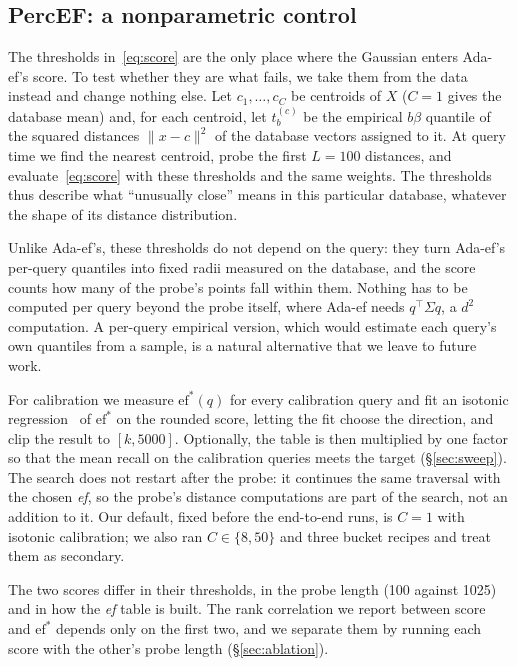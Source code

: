 \documentclass[sigconf,anonymous]{acmart}
\newcommand{\ef}{\textit{ef}}
\begin{document}
\subsection{PercEF: a nonparametric control}

The thresholds in~\eqref{eq:score} are the only place where the Gaussian enters Ada-ef's score.
To test whether they are what fails, we take them from the data instead and change nothing else. Let $c_1,\dots,c_C$ be centroids of $X$ ($C = 1$ gives the
database mean) and, for each centroid, let $t^{(c)}_b$ be the empirical $b\beta$ quantile of the
squared distances $\lVert x - c \rVert^2$ of the database vectors assigned to it. At query time we
find the nearest centroid, probe the first $L = 100$ distances, and evaluate~\eqref{eq:score} with
these thresholds and the same weights. The thresholds thus describe what ``unusually close'' means
in this particular database, whatever the shape of its distance distribution.

Unlike Ada-ef's, these thresholds do not depend on the query: they turn Ada-ef's per-query
quantiles into fixed radii measured on the database, and the score counts how many of the probe's
points fall within them. Nothing has to be computed per query beyond the probe itself, where Ada-ef
needs $q^\top\Sigma q$, a $d^2$ computation. A per-query empirical version, which would estimate each
query's own quantiles from a sample, is a natural alternative that we leave to future work.

For calibration we measure $\mathrm{ef}^*(q)$ for every calibration query and fit an isotonic
regression~\cite{barlow1972isotonic} of $\mathrm{ef}^*$ on the rounded score, letting the fit
choose the direction, and clip the result to $[k, 5000]$. Optionally, the table is then multiplied by
one factor so that the mean recall on the calibration queries meets the target (\S\ref{sec:sweep}). The search does not restart after the
probe: it continues the same traversal with the chosen \ef{}, so the probe's distance computations
are part of the search, not an addition to it. Our default, fixed before the end-to-end runs, is
$C = 1$ with isotonic calibration; we also ran $C \in \{8, 50\}$ and three bucket recipes and treat
them as secondary.

The two scores differ in their thresholds, in the probe length (100 against 1025) and in how the
\ef{} table is built. The rank correlation we report between score and $\mathrm{ef}^*$ depends only
on the first two, and we separate them by running each score with the other's probe length
(\S\ref{sec:ablation}).
\end{document}

